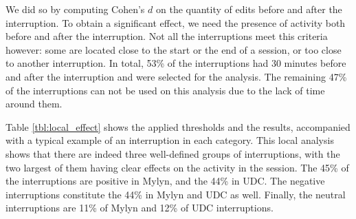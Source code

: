 \documentclass[times]{smrauth}
\begin{document}
We did so by computing Cohen's $d$ on the quantity of edits before and after the interruption. To obtain a significant effect, we need the presence of activity both before and after the interruption. Not all the interruptions meet this criteria however: some are located close to the start or the end of a session, or too close to another interruption.  In total, 53\% of the interruptions had 30 minutes before and after the interruption and were selected for the analysis.  The remaining 47\% of the interruptions can not be used on this analysis due to the lack of time around them. %


Table \ref{tbl:local_effect} shows the applied thresholds and the results, accompanied with a typical example of an interruption in each category. This local analysis shows that there are indeed three well-defined groups of interruptions, with the two largest of them having clear effects on the activity in the session. The 45\% of the interruptions are positive in Mylyn, and the 44\% in UDC. The negative interruptions constitute the 44\% in Mylyn and UDC as well. Finally, the neutral interruptions are 11\% of Mylyn and 12\% of UDC interruptions.
\end{document}
